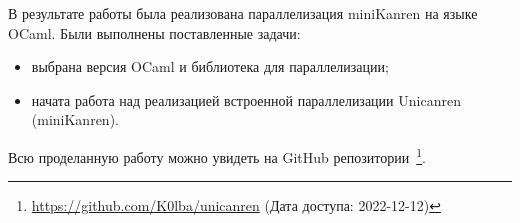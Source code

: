 

В результате работы была реализована параллелизация miniKanren на языке OCaml.
Были выполнены поставленные задачи:


\begin{itemize}
\item выбрана версия OCaml и библиотека для параллелизации;
\item начата работа над реализацией встроенной параллелизации Unicanren (miniKanren).
\end{itemize}

Всю проделанную работу можно увидеть на GitHub репозитории~\footnote{\url{https://github.com/K0lba/unicanren} (Дата доступа: 2022-12-12)}.





